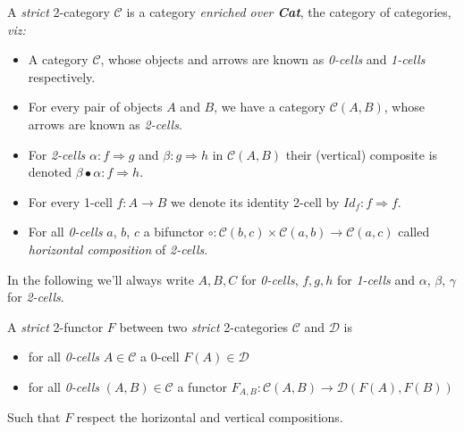 \documentclass[a4paper]{article}
\begin{document}
\begin{definition}  \label{def:strict-two-cat}
  A \emph{strict} 2-category $\mathcal{C}$ is a category \emph{enriched over
    \textbf{Cat}}, the category of categories, \emph{viz:}
  \begin{itemize}
    \item A category $\mathcal{C}$, whose objects and arrows are known as
      \emph{0-cells} and \emph{1-cells} respectively.
    \item For every pair of objects $A$ and $B$, we have a
      category $\mathcal{C}(A, B)$, whose arrows are known as \emph{2-cells}.
    \item For \emph{2-cells} $\alpha : f \Rightarrow g$ and $\beta : g
      \Rightarrow h$ in $\mathcal{C}(A,B)$ their (vertical) composite is denoted
      $\beta \bullet \alpha : f \Rightarrow h$.
    \item For every 1-cell $f:A\to B$ we denote its identity 2-cell by
      $Id_f:f \Rightarrow f$.
    \item For all \emph{0-cells} $a$, $b$, $c$ a bifunctor $\circ:
      \mathcal{C}(b, c) \times \mathcal{C}(a, b) \to \mathcal{C}(a, c)$ called
      \emph{horizontal composition} of \emph{2-cells}.
  \end{itemize}
\end{definition}

\noindent
In the following we'll always write $A, B, C$ for \emph{0-cells}, $f,
g, h$ for \emph{1-cells} and $\alpha$, $\beta$, $\gamma$ for
\emph{2-cells}.

\begin{definition} \label{def:two-functor}
  A \emph{strict} 2-functor $F$ between two \emph{strict} 2-categories
    $\mathcal{C}$ and $\mathcal{D}$ is
  \begin{itemize}
    \item for all \emph{0-cells} $A \in \mathcal{C}$ a 0-cell $F(A) \in
      \mathcal{D}$
    \item for all \emph{0-cells} $(A, B) \in \mathcal{C}$ a functor $F_{A, B}:
      \mathcal{C}(A, B) \to \mathcal{D}(F(A), F(B))$
  \end{itemize}

  \noindent
  Such that $F$ respect the horizontal and vertical compositions.
\end{definition}
\end{document}
